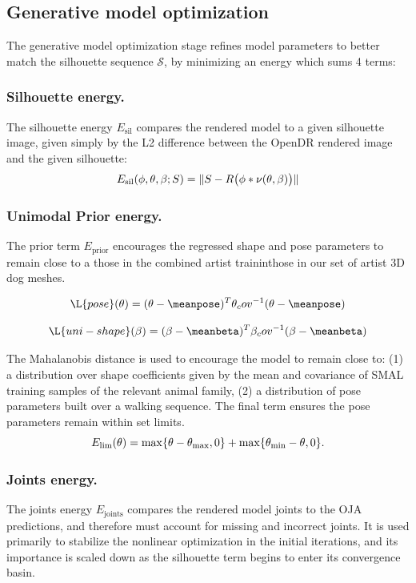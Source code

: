   \subsection{Generative model optimization}
  \def\E#1{{E_{\text{#1}}}}
  The generative model optimization stage refines model parameters to better match the silhouette sequence $\mathcal S$, by minimizing an energy which sums 4 terms:
  
  \def\ss#1{\vspace{-0ex}\subsubsection{#1}}
  
  \ss{Silhouette energy.}
  The silhouette energy $\E{sil}$ compares the rendered model to a given silhouette image, given simply by the L2 difference between the OpenDR rendered image and the given silhouette:
  \begin{equation}
  \E{sil}(\posn, \pose, \shape; S) = \lVert S - R\bigl(\posn * \verts(\pose, \shape)\bigr) \rVert
  \end{equation}
  
  \ss{Unimodal Prior energy.}
  The prior term $\E{prior}$ encourages the regressed shape and pose parameters to remain close to a those in the combined artist traininthose in our set of artist 3D dog meshes.
  
  \begin{equation}
      \L{pose}(\pose) = (\pose - \meanpose)^T \pose_cov^{-1} (\pose - \meanpose)
  \end{equation}
  
  \begin{equation}
      \L{uni-shape}(\beta) = (\beta - \meanbeta)^T \beta_cov^{-1} (\beta - \meanbeta)
  \end{equation}
  
  The Mahalanobis distance is used to encourage the model to remain close to: (1) a distribution over shape coefficients given by the mean and covariance of SMAL training samples of the relevant animal family, (2) a distribution of pose parameters built over a walking sequence. The final term ensures the pose parameters remain within set limits.
  \begin{equation}
  \E{lim}(\pose) = \max\{\pose - \pose_{\text{max}}, 0\} + \max\{\pose_{\text{min}} - \pose, 0\}.
  \end{equation}
  
  \ss{Joints energy.}
  The joints energy $\E{joints}$ compares the rendered model joints to the OJA predictions, and therefore must account for missing and incorrect joints.  It is used primarily to stabilize the nonlinear optimization in the initial iterations, and its importance is scaled down as the silhouette term begins to enter its convergence basin.
  
